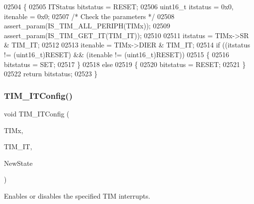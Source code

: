 \begin{DoxyCode}
02504 \{
02505   ITStatus bitstatus = RESET;  
02506   uint16\_t itstatus = 0x0, itenable = 0x0;
02507   \textcolor{comment}{/* Check the parameters */}
02508   assert_param(IS_TIM_ALL_PERIPH(TIMx));
02509   assert_param(IS_TIM_GET_IT(TIM\_IT));
02510    
02511   itstatus = TIMx->SR & TIM\_IT;
02512   
02513   itenable = TIMx->DIER & TIM\_IT;
02514   \textcolor{keywordflow}{if} ((itstatus != (uint16\_t)RESET) && (itenable != (uint16\_t)RESET))
02515   \{
02516     bitstatus = SET;
02517   \}
02518   \textcolor{keywordflow}{else}
02519   \{
02520     bitstatus = RESET;
02521   \}
02522   \textcolor{keywordflow}{return} bitstatus;
02523 \}
\end{DoxyCode}
\mbox{\label{group__TIM__Group5_ga70e3d6c09d55ee69002e154c85cd40e4}} 
\subsubsection{T\+I\+M\+\_\+\+I\+T\+Config()}
{\footnotesize\ttfamily void T\+I\+M\+\_\+\+I\+T\+Config (\begin{DoxyParamCaption}\item[{\textbf{ T\+I\+M\+\_\+\+Type\+Def} $\ast$}]{T\+I\+Mx,  }\item[{uint16\+\_\+t}]{T\+I\+M\+\_\+\+IT,  }\item[{\textbf{ Functional\+State}}]{New\+State }\end{DoxyParamCaption})}



Enables or disables the specified T\+IM interrupts. 


